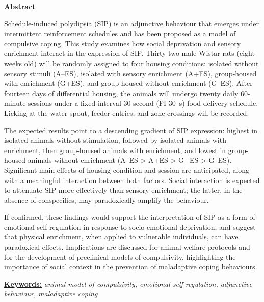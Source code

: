 \documentclass[12pt,a4paper]{article}
\begin{document}
    \vspace{5mm}
    
    \begin{center}
    \textbf{\large Abstract}
    \end{center}
    
    \begin{center}
    \begin{minipage}{0.9\textwidth}
    \noindent
    Schedule-induced polydipsia (SIP) is an adjunctive behaviour that emerges under intermittent reinforcement schedules and has been proposed as a model of compulsive coping. This study examines how social deprivation and sensory enrichment interact in the expression of SIP. Thirty-two male Wistar rats (eight weeks old) will be randomly assigned to four housing conditions: isolated without sensory stimuli (A--ES), isolated with sensory enrichment (A+ES), group-housed with enrichment (G+ES), and group-housed without enrichment (G--ES). After fourteen days of differential housing, the animals will undergo twenty daily 60-minute sessions under a fixed-interval 30-second (FI-30~s) food delivery schedule. Licking at the water spout, feeder entries, and zone crossings will be recorded.

    The expected results point to a descending gradient of SIP expression: highest in isolated animals without stimulation, followed by isolated animals with enrichment, then group-housed animals with enrichment, and lowest in group-housed animals without enrichment (A--ES > A+ES > G+ES > G--ES). Significant main effects of housing condition and session are anticipated, along with a meaningful interaction between both factors. Social interaction is expected to attenuate SIP more effectively than sensory enrichment; the latter, in the absence of conspecifics, may paradoxically amplify the behaviour.

    If confirmed, these findings would support the interpretation of SIP as a form of emotional self-regulation in response to socio-emotional deprivation, and suggest that physical enrichment, when applied to vulnerable individuals, can have paradoxical effects. Implications are discussed for animal welfare protocols and for the development of preclinical models of compulsivity, highlighting the importance of social context in the prevention of maladaptive coping behaviours.
    
    \vspace{2mm}
    \noindent
    \underline{\textbf{Keywords:}} \textit{animal model of compulsivity, emotional self-regulation, adjunctive behaviour, maladaptive coping}
    \end{minipage}
    \end{center}
    
\end{document}
